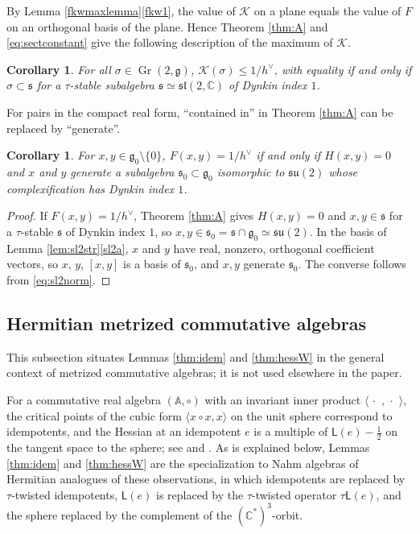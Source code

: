 \documentclass[leqno,10pt]{amsart}
\newtheorem{corollary}[theorem]{Corollary}%
\theoremstyle{definition}
\numberwithin{equation}{section}
\newcommand{\grass}{\operatorname{Gr}}
\newcommand{\sect}{\mathscr{K}}
\newcommand{\alg}{\mathbb{A}}
\newcommand{\mlt}{\circ}
\newcommand{\dum}{\,\cdot\,\,}
\newcommand{\lin}{\mathsf{L}}
\newcommand{\su}{\mathfrak{su}}
\newcommand{\sll}{\mathfrak{sl}}
\newcommand{\g}{\mathfrak{g}}
\newcommand{\com}{\mathbb C}
\newcommand{\gz}{\g_{0}}
\newcommand{\hv}{h^\vee}
\newcommand{\subs}{\mathfrak{s}}
\begin{document}
By Lemma \ref{fkwmaxlemma}\ref{fkw1}, the value of $\sect$ on a plane equals the value of $F$ on an orthogonal basis of the plane. Hence Theorem \ref{thm:A} and \eqref{eq:sectconstant} give the following description of the maximum of $\sect$.
\begin{corollary}\label{cor:sectmax}
For all $\sigma \in \grass(2, \g)$, $\sect(\sigma)  \leq 1/\hv$, with equality if and only if $\sigma \subset \subs$ for a $\tau$-stable subalgebra $\subs \simeq \sll(2, \com)$ of Dynkin index $1$.
\end{corollary}

For pairs in the compact real form, ``contained in'' in Theorem \ref{thm:A} can be replaced by ``generate''.
\begin{corollary}\label{cor:compactequality}
For $x, y \in \gz\setminus\{0\}$, $F(x, y) = 1/\hv$ if and only if $H(x, y) = 0$ and $x$ and $y$ generate a subalgebra $\subs_{0} \subset \gz$ isomorphic to $\su(2)$ whose complexification has Dynkin index $1$.
\end{corollary}
\begin{proof}
If $F(x, y) = 1/\hv$, Theorem \ref{thm:A} gives $H(x, y) = 0$ and $x, y \in \subs$ for a $\tau$-stable $\subs$ of Dynkin index $1$, so $x, y \in \subs_{0} = \subs \cap \gz \simeq \su(2)$. In the basis of Lemma \ref{lem:sl2str}\ref{sl2a}, $x$ and $y$ have real, nonzero, orthogonal coefficient vectors, so $x$, $y$, $[x, y]$ is a basis of $\subs_{0}$, and $x, y$ generate $\subs_{0}$. The converse follows from \eqref{eq:sl2norm}.
\end{proof}

\subsection{Hermitian metrized commutative algebras}\label{sec:hermitianmetrized}
This subsection situates Lemmas \ref{thm:idem} and \ref{thm:hessW} in the general context of metrized commutative algebras; it is not used elsewhere in the paper.

For a commutative real algebra $(\alg, \mlt)$ with an invariant inner product $\langle\dum, \dum\rangle$, the critical points of the cubic form $\langle x \mlt x, x\rangle$ on the unit sphere correspond to idempotents, and the Hessian at an idempotent $e$ is a multiple of $\lin(e) - \tfrac{1}{2}$ on the tangent space to the sphere; see \cite[Lemma $2.3$]{Tkachev-correction} and \cite{Fox-trace, Fox-Tkachev, Tkachev-universality}. As is explained below, Lemmas \ref{thm:idem} and \ref{thm:hessW} are the specialization to Nahm algebras of Hermitian analogues of these observations, in which idempotents are replaced by $\tau$-twisted idempotents, $\lin(e)$ is replaced by the $\tau$-twisted operator $\tau\lin(e)$, and the sphere replaced by the complement of the $(\com^{\ast})^{3}$-orbit. 
\end{document}
